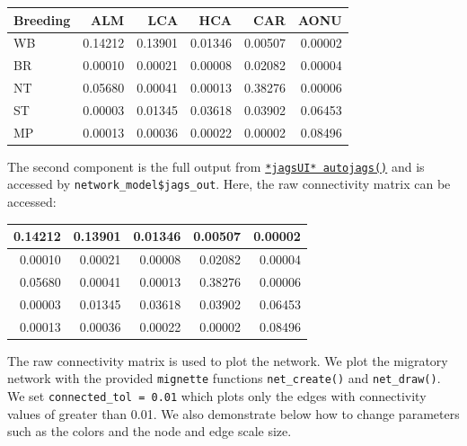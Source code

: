 \documentclass[
]{book}
\newenvironment{Shaded}{\begin{snugshade}}{\end{snugshade}}
\newcommand{\NormalTok}[1]{#1}
\newcommand{\OtherTok}[1]{\textcolor[rgb]{0.56,0.35,0.01}{#1}}
\newcommand{\SpecialCharTok}[1]{\textcolor[rgb]{0.81,0.36,0.00}{\textbf{#1}}}
\begin{document}
\begin{tabular}{l|r|r|r|r|r}
\hline
Breeding & ALM & LCA & HCA & CAR & AONU\\
\hline
WB & 0.14212 & 0.13901 & 0.01346 & 0.00507 & 0.00002\\
\hline
BR & 0.00010 & 0.00021 & 0.00008 & 0.02082 & 0.00004\\
\hline
NT & 0.05680 & 0.00041 & 0.00013 & 0.38276 & 0.00006\\
\hline
ST & 0.00003 & 0.01345 & 0.03618 & 0.03902 & 0.06453\\
\hline
MP & 0.00013 & 0.00036 & 0.00022 & 0.00002 & 0.08496\\
\hline
\end{tabular}

The second component is the full output from \href{https://rdrr.io/cran/jagsUI/man/autojags.html}{\texttt{*jagsUI*\ autojags()}} and is accessed by \texttt{network\_model\$jags\_out}. Here, the raw connectivity matrix can be accessed:

\begin{Shaded}
\end{Shaded}

\begin{tabular}{r|r|r|r|r}
\hline
0.14212 & 0.13901 & 0.01346 & 0.00507 & 0.00002\\
\hline
0.00010 & 0.00021 & 0.00008 & 0.02082 & 0.00004\\
\hline
0.05680 & 0.00041 & 0.00013 & 0.38276 & 0.00006\\
\hline
0.00003 & 0.01345 & 0.03618 & 0.03902 & 0.06453\\
\hline
0.00013 & 0.00036 & 0.00022 & 0.00002 & 0.08496\\
\hline
\end{tabular}

The raw connectivity matrix is used to plot the network. We plot the migratory network with the provided \texttt{mignette} functions \texttt{net\_create()} and \texttt{net\_draw()}. We set \texttt{connected\_tol\ =\ 0.01} which plots only the edges with connectivity values of greater than 0.01. We also demonstrate below how to change parameters such as the colors and the node and edge scale size.
\end{document}
